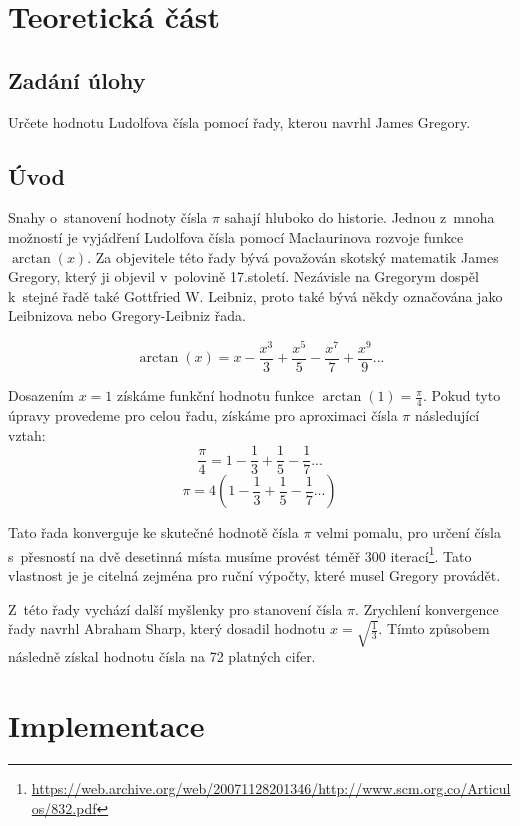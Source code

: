 \documentclass[11pt,a4paper,twoside,openright]{report}
\begin{document}
	
	
	
	\setcounter{tocdepth}{2}
	\tableofcontents
	
	\chapter{Teoretická část}
	\pagestyle{fancy}
		
	\section{Zadání úlohy}
	Určete hodnotu Ludolfova čísla pomocí řady, kterou navrhl James Gregory.
	
	\section{Úvod}
	Snahy o~stanovení hodnoty čísla $\pi$ sahají hluboko do historie. Jednou z~mnoha možností je vyjádření Ludolfova čísla pomocí Maclaurinova rozvoje funkce $\arctan(x)$. Za objevitele této řady bývá považován skotský matematik James Gregory, který ji objevil v~polovině 17.století. Nezávisle na Gregorym dospěl k~stejné řadě také  Gottfried W. 
    Leibniz, proto také bývá někdy označována jako Leibnizova nebo Gregory-Leibniz řada.
    
    $$\arctan(x) = x-\frac{x^3}{3}+\frac{x^5}{5}-\frac{x^7}{7}+\frac{x^9}{9}...$$
    
    Dosazením $x = 1$ získáme funkční hodnotu funkce $\arctan(1)=\frac{\pi}{4}$. Pokud tyto úpravy provedeme pro celou řadu, získáme pro aproximaci čísla $\pi$ následující vztah:
    $$\frac{\pi}{4}=1-\frac{1}{3}+\frac{1}{5}-\frac{1}{7}...$$
    $$\pi=4\left(1-\frac{1}{3}+\frac{1}{5}-\frac{1}{7}...\right)$$
    
    Tato řada konverguje ke skutečné hodnotě čísla $\pi$ velmi pomalu, pro určení čísla s~přesností na dvě desetinná místa musíme provést téměř 300 iterací\footnote{\url{https://web.archive.org/web/20071128201346/http://www.scm.org.co/Articulos/832.pdf}}. Tato vlastnost je je citelná zejména pro ruční výpočty, které musel Gregory provádět.
    
    Z~této řady vychází další myšlenky pro stanovení čísla $\pi$. Zrychlení konvergence řady navrhl Abraham Sharp, který dosadil hodnotu $x=\sqrt{\frac{1}{3}}$. Tímto způsobem následně získal hodnotu čísla na 72 platných cifer.
	

	\chapter{Implementace}
\end{document}

